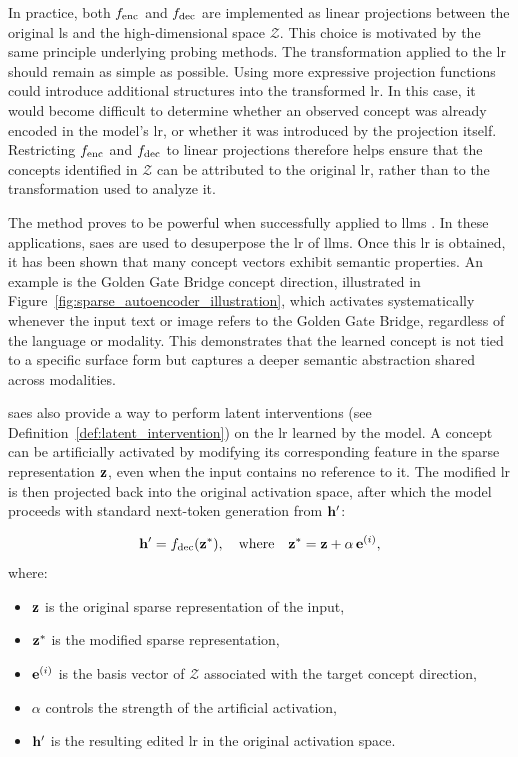 In practice, both $\Encoder$ and $\Decoder$ are implemented as linear projections between the original \gls{ls} and the high-dimensional space $\mathcal{Z}$. This choice is motivated by the same principle underlying probing methods. The transformation applied to the \gls{lr} should remain as simple as possible.
Using more expressive projection functions could introduce additional structures into the transformed \gls{lr}. In this case, it would become difficult to determine whether an observed concept was already encoded in the model's \gls{lr}, or whether it was introduced by the projection itself. Restricting $\Encoder$ and $\Decoder$ to linear projections therefore helps ensure that the concepts identified in $\mathcal{Z}$ can be attributed to the original \gls{lr}, rather than to the transformation used to analyze it.

The method proves to be powerful when successfully applied to \glspl{llm} \parencite{templeton2024scaling}.
In these applications, \glspl{sae} are used to desuperpose the \gls{lr} of \glspl{llm}.
Once this \gls{lr} is obtained, it has been shown that many concept vectors exhibit semantic properties.
An example is the Golden Gate Bridge concept direction, illustrated in Figure~\ref{fig:sparse_autoencoder_illustration}, which activates systematically whenever the input text or image refers to the Golden Gate Bridge, regardless of the language or modality.
This demonstrates that the learned concept is not tied to a specific surface form but captures a deeper semantic abstraction shared across modalities.



\glspl{sae} also provide a way to perform latent interventions (see Definition~\ref{def:latent_intervention}) on the \gls{lr} learned by the model.
A concept can be artificially activated by modifying its corresponding feature in the sparse representation $\mathbf{z}$, even when the input contains no reference to it.
The modified \gls{lr} is then projected back into the original activation space, after which the model proceeds with standard next-token generation from $\latentRepresentation'$:
\begin{equationwhere}
\[
\latentRepresentation' = \Decoder(\vect{z}^*), \quad \text{where} \quad \vect{z}^* = \vect{z} + \alpha \, \vect{e}^{(i)},
\]
where:
\begin{itemize}
    \item $\mathbf{z}$ is the original sparse representation of the input,
    \item $\mathbf{z}^*$ is the modified sparse representation,
    \item $\mathbf{e}^{(i)}$ is the basis vector of $\mathcal{Z}$ associated with the target concept direction,
    \item $\alpha$ controls the strength of the artificial activation,
    \item $\latentRepresentation'$ is the resulting edited \gls{lr} in the original activation space.
\end{itemize}
\end{equationwhere}

